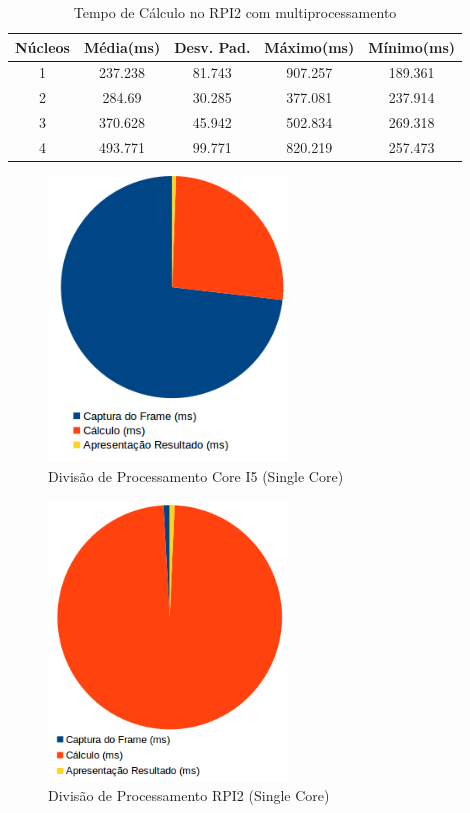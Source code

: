 \documentclass[conference]{IEEEtran}
\begin{document}
\begin{table}[h]\centering
\renewcommand{\arraystretch}{1.3}
\caption{Tempo de Cálculo no RPI2 com multiprocessamento}
\label{tab:table_rpi_cores_calc}
\begin{tabular}{|c|c|c|c|c|}

\hline
\textbf{Núcleos} & \textbf{Média(ms)} & \textbf{Desv. Pad.} & \textbf{Máximo(ms)} & \textbf{Mínimo(ms)} \\\hline \hline
1		&	237.238	&	81.743	&	907.257	&	189.361	\\ \hline
2		&	284.69	&	30.285	&	377.081	&	237.914	\\ \hline
3		&	370.628	&	45.942	&	502.834	&	269.318	\\ \hline
4		&	493.771	&	99.771	&	820.219	&	257.473	\\ \hline


\end{tabular}
\end{table}

\begin{figure}[!t]
\centering
\includegraphics[width=2.5in]{Grafico_processamento_I5}
\caption{Divisão de Processamento Core I5 (Single Core)}
\label{fig:processamento_pc}
\end{figure}

\begin{figure}[!t]
\centering
\includegraphics[width=2.5in]{Grafico_processamento_rpi2_single_core}
\caption{Divisão de Processamento RPI2 (Single Core)}
\label{fig:processamento_rpi}
\end{figure}
\end{document}
